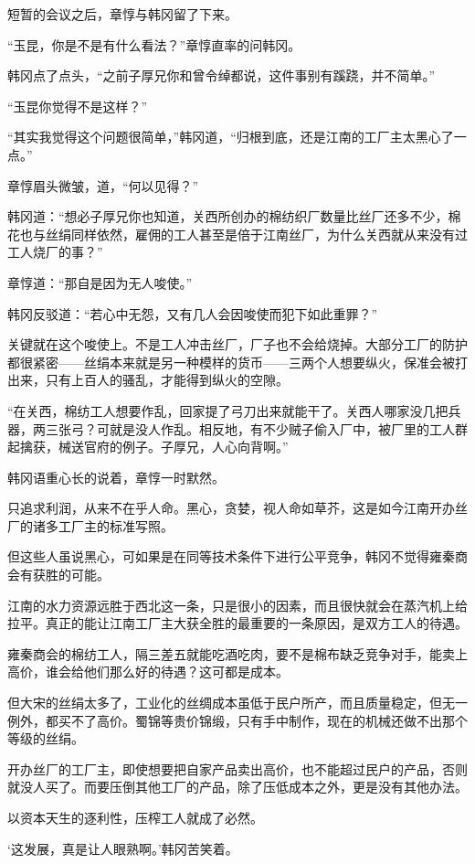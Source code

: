 短暂的会议之后，章惇与韩冈留了下来。

“玉昆，你是不是有什么看法？”章惇直率的问韩冈。

韩冈点了点头，“之前子厚兄你和曾令绰都说，这件事别有蹊跷，并不简单。”

“玉昆你觉得不是这样？”

“其实我觉得这个问题很简单，”韩冈道，“归根到底，还是江南的工厂主太黑心了一点。”

章惇眉头微皱，道，“何以见得？”

韩冈道：“想必子厚兄你也知道，关西所创办的棉纺织厂数量比丝厂还多不少，棉花也与丝绢同样依然，雇佣的工人甚至是倍于江南丝厂，为什么关西就从来没有过工人烧厂的事？”

章惇道：“那自是因为无人唆使。”

韩冈反驳道：“若心中无怨，又有几人会因唆使而犯下如此重罪？”

关键就在这个唆使上。不是工人冲击丝厂，厂子也不会给烧掉。大部分工厂的防护都很紧密——丝绢本来就是另一种模样的货币——三两个人想要纵火，保准会被打出来，只有上百人的骚乱，才能得到纵火的空隙。

“在关西，棉纺工人想要作乱，回家提了弓刀出来就能干了。关西人哪家没几把兵器，两三张弓？可就是没人作乱。相反地，有不少贼子偷入厂中，被厂里的工人群起擒获，械送官府的例子。子厚兄，人心向背啊。”

韩冈语重心长的说着，章惇一时默然。

只追求利润，从来不在乎人命。黑心，贪婪，视人命如草芥，这是如今江南开办丝厂的诸多工厂主的标准写照。

但这些人虽说黑心，可如果是在同等技术条件下进行公平竞争，韩冈不觉得雍秦商会有获胜的可能。

江南的水力资源远胜于西北这一条，只是很小的因素，而且很快就会在蒸汽机上给拉平。真正的能让江南工厂主大获全胜的最重要的一条原因，是双方工人的待遇。

雍秦商会的棉纺工人，隔三差五就能吃酒吃肉，要不是棉布缺乏竞争对手，能卖上高价，谁会给他们那么好的待遇？这可都是成本。

但大宋的丝绢太多了，工业化的丝绸成本虽低于民户所产，而且质量稳定，但无一例外，都买不了高价。蜀锦等贵价锦缎，只有手中制作，现在的机械还做不出那个等级的丝绢。

开办丝厂的工厂主，即使想要把自家产品卖出高价，也不能超过民户的产品，否则就没人买了。而要压倒其他工厂的产品，除了压低成本之外，更是没有其他办法。

以资本天生的逐利性，压榨工人就成了必然。

‘这发展，真是让人眼熟啊。’韩冈苦笑着。
